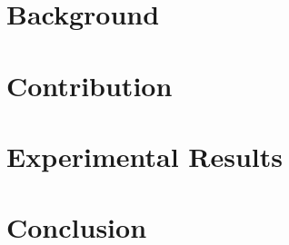 \documentclass[12pt,twoside]{report}
\begin{document}
\chapter{Background}



\chapter{Contribution}


\chapter{Experimental Results}


\chapter{Conclusion}



\end{document}
